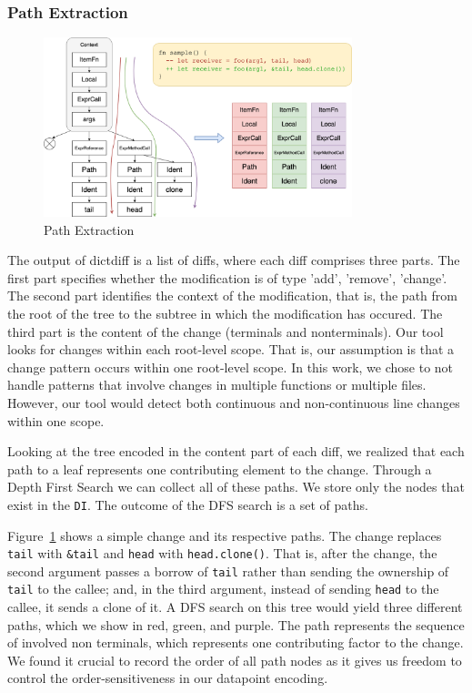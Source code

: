 \subsubsection{Path Extraction}

\begin{figure}[h]
\centering
\includegraphics[width=0.8\textwidth]{extraction.png}
\caption{\label{fig:extraction}Path Extraction}
\end{figure}

The output of dictdiff is a list of diffs, where each diff comprises three parts. The first part specifies whether the modification is of type 'add', 'remove', 'change'. The second part identifies the context of the modification, that is, the path from the root of the tree to the subtree in which the modification has occured. The third part is the content of the change (terminals and nonterminals). Our tool looks for changes within each root-level scope. That is, our assumption is that a change pattern occurs within one root-level scope. In this work, we chose to not handle patterns that involve changes in multiple functions or multiple files. However, our tool would detect both continuous and non-continuous line changes within one scope.

Looking at the tree encoded in the content part of each diff, we realized that each path to a leaf represents one contributing element to the change. Through a Depth First Search we can collect all of these paths. We store only the nodes that exist in the \verb+DI+. The outcome of the DFS search is a set of paths.

Figure~\ref{fig:extraction} shows a simple change and its respective paths. The change replaces \verb+tail+ with \verb+&tail+ and \verb+head+ with \verb+head.clone()+. That is, after the change, the second argument passes a borrow of \verb+tail+ rather than sending the ownership of \verb+tail+ to the callee; and, in the third argument, instead of sending \verb+head+ to the callee, it sends a clone of it. A DFS search on this tree would yield three different paths, which we show in red, green, and purple. The path represents the sequence of involved non terminals, which represents one contributing factor to the change. We found it crucial to record the order of all path nodes as it gives us freedom to control the order-sensitiveness in our datapoint encoding.

